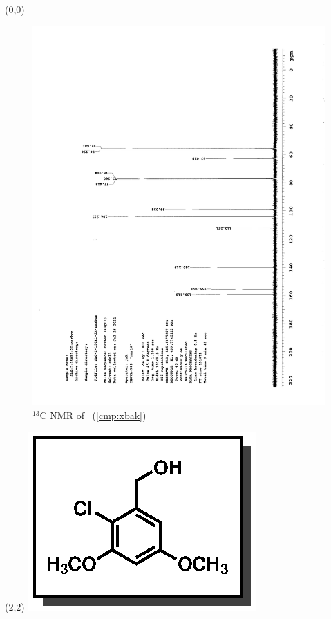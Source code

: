 \clearpage
\begin{textblock}{20}(0,0)
\begin{figure}[htb]
\caption{$^{13}$C NMR of  \CMPxbak\ (\ref{cmp:xbak})}
\includegraphics[scale=0.75, trim = 0mm 0mm 0mm 5mm,
clip]{chp_singlecarbon/images/nmr/xbakC}
\vspace{-100pt}
\end{figure}
\end{textblock}
\begin{textblock}{1}(2,2)
\includegraphics[scale=0.8, angle=90]{chp_singlecarbon/images/xbak}
\end{textblock}
\clearpage

